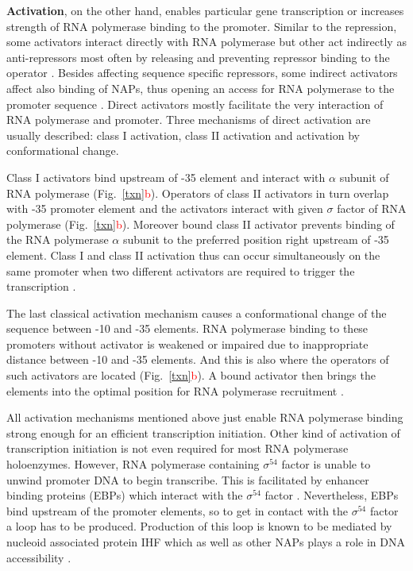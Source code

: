 \textbf{Activation}, on the other hand, enables particular gene transcription or increases strength of RNA polymerase binding to the promoter.
Similar to the repression, some activators interact directly with RNA polymerase but other act indirectly as anti-repressors most often by releasing and preventing repressor binding to the operator \cite{frederix2011co}.
Besides affecting sequence specific repressors, some indirect activators affect also binding of NAPs, thus opening an access for RNA polymerase to the promoter sequence \cite{santana2001transcriptional}.
Direct activators mostly facilitate the very interaction of RNA polymerase and promoter.
Three mechanisms of direct activation are usually described: class I activation, class II activation and activation by conformational change.

Class I activators bind upstream of -35 element and interact with $\alpha$ subunit of RNA polymerase \cite{ushida1990helical} (Fig.~\ref{txn}\textcolor{red}{b}).
Operators of class II activators in turn overlap with -35 promoter element and the activators interact with given $\sigma$ factor of RNA polymerase \cite{igarashi1991functional} (Fig.~\ref{txn}\textcolor{red}{b}).
Moreover bound class II activator prevents binding of the RNA polymerase $\alpha$ subunit to the preferred position right upstream of -35 element.
Class I and class II activation thus can occur simultaneously on the same promoter when two different activators are required to trigger the transcription \cite{lloyd2002requirement}.

The last classical activation mechanism causes a conformational change of the sequence between -10 and -35 elements.
RNA polymerase binding to these promoters without activator is weakened or impaired due to inappropriate distance between -10 and -35 elements.
And this is also where the operators of such activators are located (Fig.~\ref{txn}\textcolor{red}{b}).
A bound activator then brings the elements into the optimal position for RNA polymerase recruitment \cite{heldwein2001crystal}.

All activation mechanisms mentioned above just enable RNA polymerase binding strong enough for an efficient transcription initiation.
Other kind of activation of transcription initiation is not even required for most RNA polymerase holoenzymes.
However, RNA polymerase containing $\sigma^{54}$ factor is unable to unwind promoter DNA to begin transcribe.
This is facilitated by enhancer binding proteins (EBPs) which interact with the $\sigma^{54}$ factor \cite{morett1989vivo, cannon2000dna}.
Nevertheless, EBPs bind upstream of the promoter elements, so to get in contact with the $\sigma^{54}$ factor a loop has to be produced.
Production of this loop is known to be mediated by nucleoid associated protein IHF which as well as other NAPs plays a role in DNA accessibility \cite{de1991upstream, sze2001vivo}.


